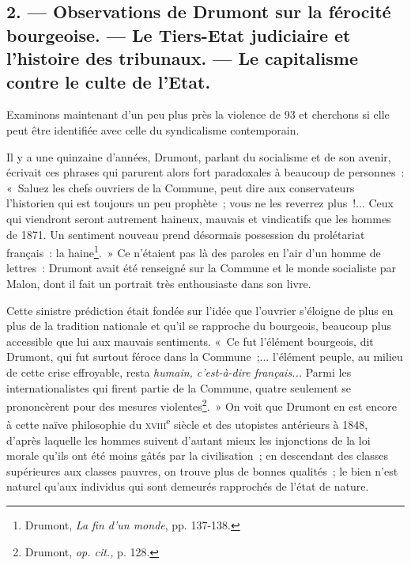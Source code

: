 \documentclass[french,twoside]{book} %
\begin{document}
\subsection[{2. — Observations de Drumont sur la férocité bourgeoise. — Le Tiers-Etat judiciaire et l’histoire des tribunaux. — Le capitalisme contre le culte de l’Etat.}]{2. — Observations de Drumont sur la férocité bourgeoise. — Le Tiers-Etat judiciaire et l’histoire des tribunaux. — Le capitalisme contre le culte de l’Etat.}
\label{p12}
\noindent Examinons maintenant d’un peu plus près la violence de 93 et cherchons si elle peut être identifiée avec celle du syndicalisme contemporain.\par
Il y a une quinzaine d’années, Drumont, parlant du socialisme et de son avenir, écrivait ces phrases qui parurent alors fort paradoxales à beaucoup de personnes : « Saluez les chefs ouvriers de la Commune, peut dire aux conservateurs l’historien qui est toujours un peu prophète ; vous ne les reverrez plus !... Ceux qui viendront seront autrement haineux, mauvais et vindicatifs que les hommes de 1871. Un sentiment nouveau prend désormais possession du prolétariat français : la haine\footnote{ \noindent Drumont, \emph{La fin d’un monde}, pp. 137-138.
 }. » Ce  n’étaient pas là des paroles en l’air d’un homme de lettres : Drumont avait été renseigné sur la Commune et le monde socialiste par Malon, dont il fait un portrait très enthousiaste dans son livre.\par
Cette sinistre prédiction était fondée sur l’idée que l’ouvrier s’éloigne de plus en plus de la tradition nationale et qu’il se rapproche du bourgeois, beaucoup plus accessible que lui aux mauvais sentiments. « Ce fut l’élément bourgeois, dit Drumont, qui fut surtout féroce dans la Commune ;... l’élément peuple, au milieu de cette crise effroyable, resta \emph{humain, c’est-à-dire français... }Parmi les internationalistes qui firent partie de la Commune, quatre seulement se prononcèrent pour des mesures violentes\footnote{ \noindent Drumont, \emph{op. cit.,} p. 128.
 }. » On voit que Drumont en est encore à cette naïve philosophie du {\scshape xviii}\textsuperscript{e} siècle et des utopistes antérieurs à 1848, d’après laquelle les hommes suivent d’autant mieux les injonctions de la loi morale qu’ils ont été moins gâtés par la civilisation ; en descendant des classes supérieures aux classes pauvres, on trouve plus de bonnes qualités ; le bien n’est naturel qu’aux individus qui sont demeurés rapprochés de l’état de nature.\par
\end{document}
